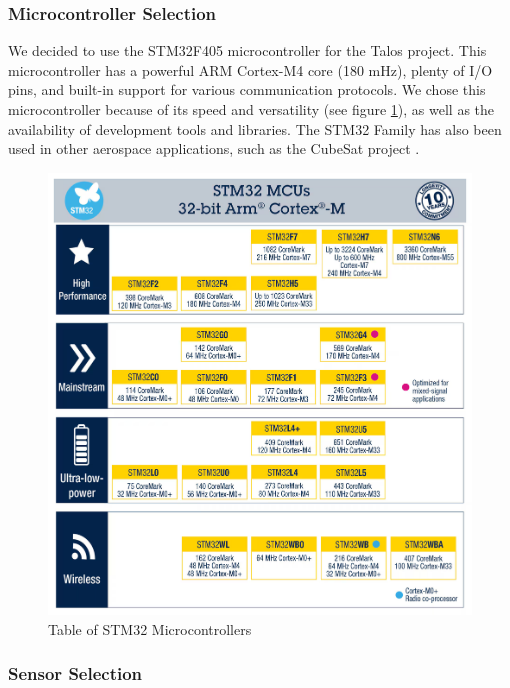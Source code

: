 \documentclass{article}
\begin{document}
\subsubsection{Microcontroller Selection}
We decided to use the STM32F405 microcontroller for the Talos project. This microcontroller has a powerful ARM Cortex-M4 core (180 mHz), plenty of I/O pins, and built-in support for various communication protocols. We chose this microcontroller because of its speed and versatility (see figure \ref{fig:microcontrollers}), as well as the availability of development tools and libraries. The STM32 Family has also been used in other aerospace applications, such as the CubeSat project \cite{Yost_2023}.
\begin{figure}[p]
      \caption{Table of STM32 Microcontrollers\cite{STM32_Table}}
      \label{fig:microcontrollers}
      \includegraphics[width=\textwidth]{stm_mcu_chart.jpg}
      \centering
\end{figure}

\subsubsection{Sensor Selection}
\end{document}
